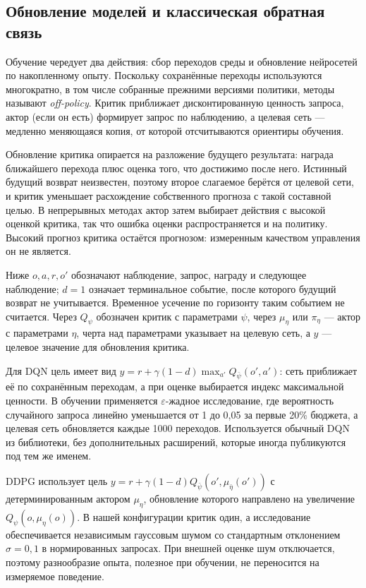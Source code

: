 \label{sec:design}
\subsection{Обновление моделей и классическая обратная связь}
Обучение чередует два действия: сбор переходов среды и обновление нейросетей по накопленному опыту. Поскольку сохранённые переходы используются многократно, в том числе собранные прежними версиями политики, методы называют \emph{off-policy}. Критик приближает дисконтированную ценность запроса, актор (если он есть) формирует запрос по наблюдению, а целевая сеть — медленно меняющаяся копия, от которой отсчитываются ориентиры обучения.

Обновление критика опирается на разложение будущего результата: награда ближайшего перехода плюс оценка того, что достижимо после него. Истинный будущий возврат неизвестен, поэтому второе слагаемое берётся от целевой сети, и критик уменьшает расхождение собственного прогноза с такой составной целью. В непрерывных методах актор затем выбирает действия с высокой оценкой критика, так что ошибка оценки распространяется и на политику. Высокий прогноз критика остаётся прогнозом: измеренным качеством управления он не является.

Ниже $o,a,r,o'$ обозначают наблюдение, запрос, награду и следующее наблюдение; $d=1$ означает терминальное событие, после которого будущий возврат не учитывается. Временное усечение по горизонту таким событием не считается. Через $Q_\psi$ обозначен критик с параметрами $\psi$, через $\mu_\eta$ или $\pi_\eta$ — актор с параметрами $\eta$, черта над параметрами указывает на целевую сеть, а $y$ — целевое значение для обновления критика.

Для DQN цель имеет вид $y=r+\gamma(1-d)\max_{a'}Q_{\bar\psi}(o',a')$: сеть приближает её по сохранённым переходам, а при оценке выбирается индекс максимальной ценности. В обучении применяется $\varepsilon$-жадное исследование, где вероятность случайного запроса линейно уменьшается от 1 до 0,05 за первые 20\% бюджета, а целевая сеть обновляется каждые 1000 переходов. Используется обычный DQN из библиотеки, без дополнительных расширений, которые иногда публикуются под тем же именем.

DDPG использует цель $y=r+\gamma(1-d)Q_{\bar\psi}(o',\mu_{\bar\eta}(o'))$ с детерминированным актором $\mu_\eta$, обновление которого направлено на увеличение $Q_\psi(o,\mu_\eta(o))$. В нашей конфигурации критик один, а исследование обеспечивается независимым гауссовым шумом со стандартным отклонением $\sigma=0{,}1$ в нормированных запросах. При внешней оценке шум отключается, поэтому разнообразие опыта, полезное при обучении, не переносится на измеряемое поведение.

